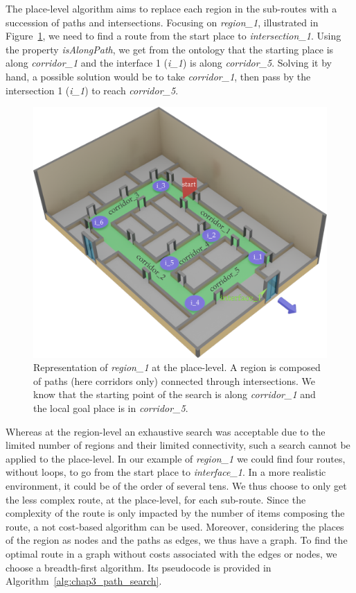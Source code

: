 The place-level algorithm aims to replace each region in the sub-routes with a succession of paths and intersections. Focusing on \textit{region\_1}, illustrated in Figure~\ref{fig:chap3_region1}, we need to find a route from the start place to \textit{intersection\_1}. Using the property \textit{isAlongPath}, we get from the ontology that the starting place is along \textit{corridor\_1} and the interface 1 (\textit{i\_1}) is along \textit{corridor\_5}. Solving it by hand, a possible solution would be to take \textit{corridor\_1}, then pass by the intersection 1 (\textit{i\_1}) to reach \textit{corridor\_5}.

\begin{figure}[ht!]
\centering
\includegraphics[scale=0.28]{figures/chapter3/region1.png}
\caption{\label{fig:chap3_region1} Representation of \textit{region\_1} at the place-level. A region is composed of paths (here corridors only) connected through intersections. We know that the starting point of the search is along \textit{corridor\_1} and the local goal place is in \textit{corridor\_5}. }
\end{figure}

Whereas at the region-level an exhaustive search was acceptable due to the limited number of regions and their limited connectivity, such a search cannot be applied to the place-level. In our example of \textit{region\_1} we could find four routes, without loops, to go from the start place to \textit{interface\_1}. In a more realistic environment, it could be of the order of several tens. We thus choose to only get the less complex route, at the place-level, for each sub-route. Since the complexity of the route is only impacted by the number of items composing the route, a not cost-based algorithm can be used. Moreover, considering the places of the region as nodes and the paths as edges, we thus have a graph. To find the optimal route in a graph without costs associated with the edges or nodes, we choose a breadth-first algorithm. Its pseudocode is provided in Algorithm~\ref{alg:chap3_path_search}.

